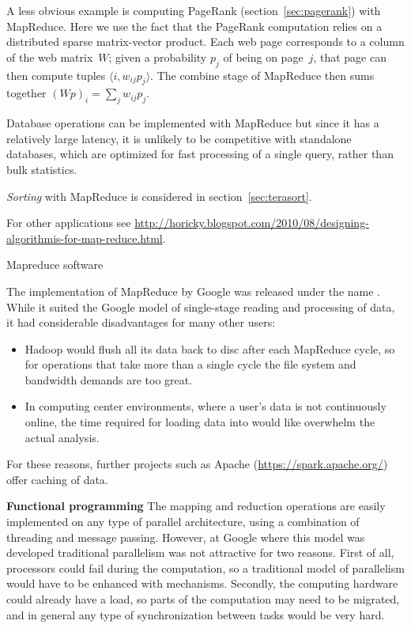 A less obvious example is computing PageRank
(section~\ref{sec:pagerank}) with MapReduce. Here we use the fact that
the PageRank computation relies on a distributed sparse matrix-vector
product. Each web page corresponds to a column of the web matrix~$W$;
given a probability $p_j$ of being on page~$j$, that page can then
compute tuples $\langle i,w_{ij}p_j\rangle$. The combine stage of MapReduce
then sums together $(Wp)_i=\sum_j w_{ij}p_j$.

Database operations can be implemented with MapReduce but since it has
a relatively large latency, it is unlikely to be competitive with
standalone databases, which are optimized for fast processing of a
single query, rather than bulk statistics.

\emph{Sorting}
  with MapReduce is considered in section~\ref{sec:terasort}.

For other applications see
\url{http://horicky.blogspot.com/2010/08/designing-algorithmis-for-map-reduce.html}.

 {Mapreduce software}

The implementation of MapReduce by Google was released under the name .
While it suited the Google model of single-stage reading and processing of data,
it had considerable disadvantages for many other users:
\begin{itemize}
\item Hadoop would flush all its data back to disc after each MapReduce cycle, so
  for operations that take more than a single cycle the file system
  and bandwidth demands are too great.
\item In computing center environments, where a user's data is not continuously online,
  the time required for loading data into  would like overwhelm the
  actual analysis.
\end{itemize}
For these reasons, further projects such as Apache  (\url{https://spark.apache.org/})
offer caching of data.

 {\bf Functional programming}
%
The mapping and reduction operations are easily implemented on any
type of parallel architecture, using a combination of threading and
message passing. However, at Google where this model was developed
traditional parallelism was not attractive for two reasons. First of
all, processors could fail during the computation, so a traditional
model of parallelism would have to be enhanced with  mechanisms. Secondly, the computing hardware could
already have a load, so parts of the computation may need to be
migrated, and in general any type of synchronization between tasks
would be very hard.

